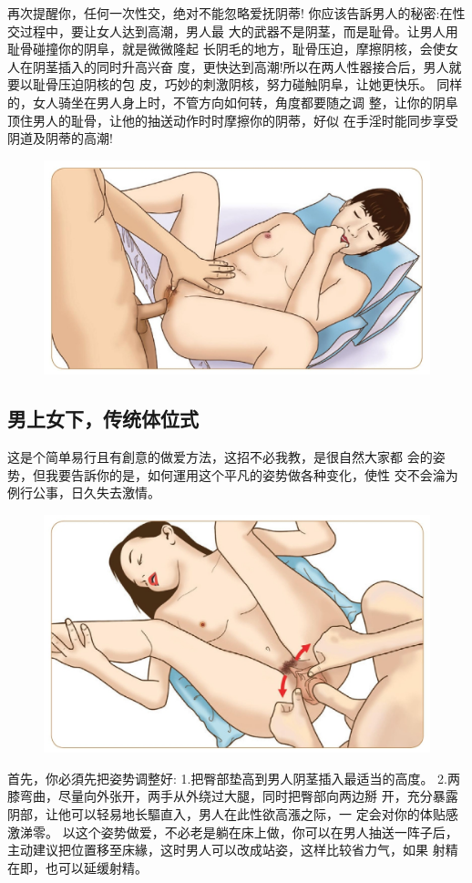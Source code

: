 \documentclass[12pt,UTF8]{ctexbook}
\begin{document}
再次提醒你，任何一次性交，绝对不能忽略爱抚阴蒂!
你应该告訴男人的秘密:在性交过程中，要让女人达到高潮，男人最
大的武器不是阴茎，而是耻骨。让男人用耻骨碰撞你的阴阜，就是微微隆起
长阴毛的地方，耻骨压迫，摩擦阴核，会使女人在阴茎插入的同时升高兴奋
度，更快达到高潮!所以在两人性器接合后，男人就要以耻骨压迫阴核的包
皮，巧妙的刺激阴核，努力碰触阴阜，让她更快乐。
同样的，女人骑坐在男人身上时，不管方向如何转，角度都要随之调
整，让你的阴阜顶住男人的耻骨，让他的抽送动作时时摩擦你的阴蒂，好似
在手淫时能同步享受阴道及阴蒂的高潮!

\begin{figure}[htbp]
	\centering
	\includegraphics[width=0.7\linewidth]{27}
	\caption{}
	\label{fig:1}
\end{figure}

\subsection{男上女下，传统体位式}

这是个简单易行且有創意的做爱方法，这招不必我教，是很自然大家都
会的姿势，但我要告訴你的是，如何運用这个平凡的姿势做各种变化，使性
交不会淪为例行公事，日久失去激情。

\begin{figure}[htbp]
	\centering
	\includegraphics[width=0.7\linewidth]{28}
	\caption{}
	\label{fig:1}
\end{figure}

首先，你必須先把姿势调整好:
1.把臀部垫高到男人阴茎插入最适当的高度。
2.两膝弯曲，尽量向外张开，两手从外绕过大腿，同时把臀部向两边掰
开，充分暴露阴部，让他可以轻易地长驅直入，男人在此性欲高漲之际，一
定会对你的体贴感激涕零。
以这个姿势做爱，不必老是躺在床上做，你可以在男人抽送一阵子后，
主动建议把位置移至床緣，这时男人可以改成站姿，这样比较省力气，如果
射精在即，也可以延缓射精。
\end{document}
